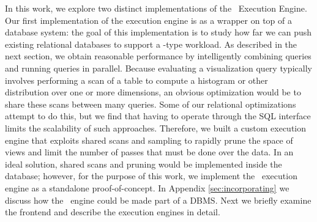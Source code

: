 In this work, we explore two distinct implementations of the \VizRecDB\ Execution
Engine. 
Our first implementation of the execution engine is as a wrapper on top of a database
system: the goal of this implementation is to study how far we can 
push existing relational databases to support a \VizRecDB-type workload.
As described in the next section, we obtain reasonable performance by
intelligently combining queries and running queries in parallel. 
Because evaluating a visualization query typically involves 
performing a scan of a table to compute  a histogram or other distribution 
over one or more dimensions, an obvious optimization would be to share 
these scans between many queries.  
Some of our relational optimizations attempt to do this, 
but we find that having to operate through the SQL interface 
limits the scalability of such approaches.  
Therefore, we built a custom execution engine that exploits 
shared scans and sampling to rapidly prune the space of views and 
limit the number of passes that must be done over the data.
In an ideal solution, shared scans and pruning would be implemented inside the
database; however, for the purpose of this work, we implement the \VizRecDB\
execution engine as a standalone proof-of-concept. 
In Appendix \ref{sec:incorporating} we discuss how the \VizRecDB\ engine could
be made part of a DBMS.
Next we briefly examine the \VizRecDB frontend and describe the execution engines
in detail.


% 



